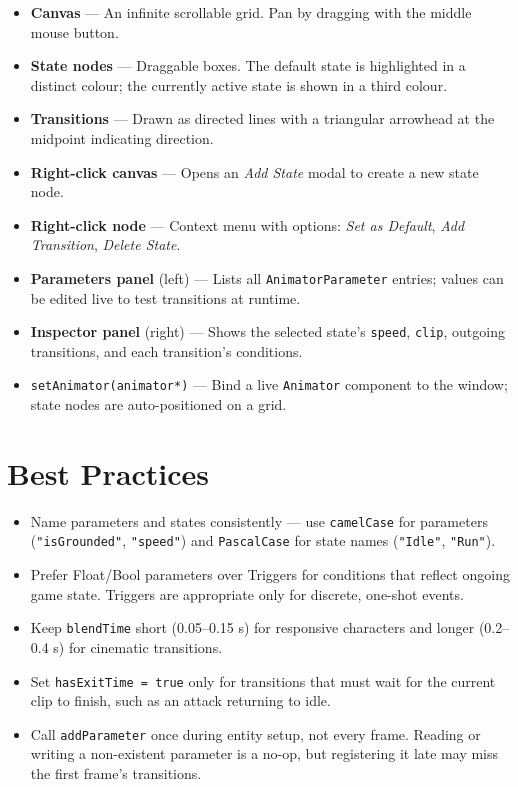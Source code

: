 \begin{itemize}[noitemsep]
  \item \textbf{Canvas} — An infinite scrollable grid. Pan by dragging with
        the middle mouse button.
  \item \textbf{State nodes} — Draggable boxes. The default state is
        highlighted in a distinct colour; the currently active state is shown
        in a third colour.
  \item \textbf{Transitions} — Drawn as directed lines with a triangular
        arrowhead at the midpoint indicating direction.
  \item \textbf{Right-click canvas} — Opens an \emph{Add State} modal to
        create a new state node.
  \item \textbf{Right-click node} — Context menu with options:
        \emph{Set as Default}, \emph{Add Transition}, \emph{Delete State}.
  \item \textbf{Parameters panel} (left) — Lists all \texttt{AnimatorParameter}
        entries; values can be edited live to test transitions at runtime.
  \item \textbf{Inspector panel} (right) — Shows the selected state's
        \texttt{speed}, \texttt{clip}, outgoing transitions, and each
        transition's conditions.
  \item \texttt{setAnimator(animator*)} — Bind a live \texttt{Animator}
        component to the window; state nodes are auto-positioned on a grid.
\end{itemize}

\section{Best Practices}

\begin{itemize}[noitemsep]
  \item Name parameters and states consistently — use \texttt{camelCase}
        for parameters (\texttt{"isGrounded"}, \texttt{"speed"}) and
        \texttt{PascalCase} for state names (\texttt{"Idle"}, \texttt{"Run"}).
  \item Prefer Float/Bool parameters over Triggers for conditions that reflect
        ongoing game state. Triggers are appropriate only for discrete,
        one-shot events.
  \item Keep \texttt{blendTime} short (0.05–0.15 s) for responsive
        characters and longer (0.2–0.4 s) for cinematic transitions.
  \item Set \texttt{hasExitTime = true} only for transitions that must wait
        for the current clip to finish, such as an attack returning to idle.
  \item Call \texttt{addParameter} once during entity setup, not every frame.
        Reading or writing a non-existent parameter is a no-op, but registering
        it late may miss the first frame's transitions.
\end{itemize}
